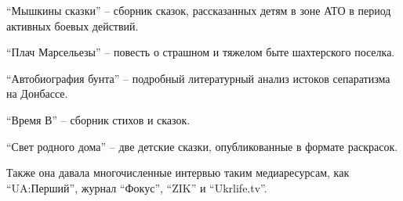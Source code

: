     “Мышкины сказки” – сборник сказок, рассказанных детям в зоне АТО в период активных боевых действий.

    “Плач Марсельезы” – повесть о страшном и тяжелом быте шахтерского поселка.

    “Автобиография бунта” – подробный литературный анализ истоков сепаратизма на Донбассе.

    “Время В” – сборник стихов и сказок.

    “Свет родного дома” – две детские сказки, опубликованные в формате раскрасок.

Также она давала многочисленные интервью таким медиаресурсам, как “UA:Перший”, журнал “Фокус”, “ZIK” и “Ukrlife.tv”.
